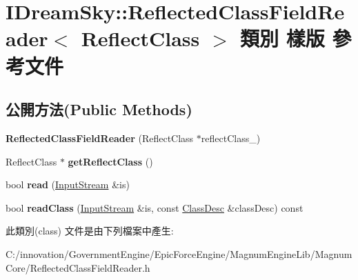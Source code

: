 \hypertarget{class_i_dream_sky_1_1_reflected_class_field_reader}{}\section{I\+Dream\+Sky\+:\+:Reflected\+Class\+Field\+Reader$<$ Reflect\+Class $>$ 類別 樣版 參考文件}
\label{class_i_dream_sky_1_1_reflected_class_field_reader}
\subsection*{公開方法(Public Methods)}
\begin{DoxyCompactItemize}
\item 
{\bfseries Reflected\+Class\+Field\+Reader} (Reflect\+Class $\ast$reflect\+Class\+\_\+)\hypertarget{class_i_dream_sky_1_1_reflected_class_field_reader_a66026e0936c334d5df855091f1c0519f}{}\label{class_i_dream_sky_1_1_reflected_class_field_reader_a66026e0936c334d5df855091f1c0519f}

\item 
Reflect\+Class $\ast$ {\bfseries get\+Reflect\+Class} ()\hypertarget{class_i_dream_sky_1_1_reflected_class_field_reader_a5f69fbfe013ab4a20a2582fe2f3d2ea6}{}\label{class_i_dream_sky_1_1_reflected_class_field_reader_a5f69fbfe013ab4a20a2582fe2f3d2ea6}

\item 
bool {\bfseries read} (\hyperlink{class_i_dream_sky_1_1_input_stream}{Input\+Stream} \&is)\hypertarget{class_i_dream_sky_1_1_reflected_class_field_reader_a6585737fbc5f0f10dde9c6b11d83a6af}{}\label{class_i_dream_sky_1_1_reflected_class_field_reader_a6585737fbc5f0f10dde9c6b11d83a6af}

\item 
bool {\bfseries read\+Class} (\hyperlink{class_i_dream_sky_1_1_input_stream}{Input\+Stream} \&is, const \hyperlink{classagm_1_1reflection_1_1_class_desc}{Class\+Desc} \&class\+Desc) const \hypertarget{class_i_dream_sky_1_1_reflected_class_field_reader_aa9fa56e81daeb90e7bb4714e69fff9bd}{}\label{class_i_dream_sky_1_1_reflected_class_field_reader_aa9fa56e81daeb90e7bb4714e69fff9bd}

\end{DoxyCompactItemize}


此類別(class) 文件是由下列檔案中產生\+:\begin{DoxyCompactItemize}
\item 
C\+:/innovation/\+Government\+Engine/\+Epic\+Force\+Engine/\+Magnum\+Engine\+Lib/\+Magnum\+Core/Reflected\+Class\+Field\+Reader.\+h\end{DoxyCompactItemize}
